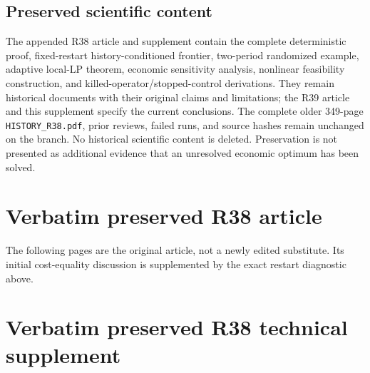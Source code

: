 \subsection{Preserved scientific content}
The appended R38 article and supplement contain the complete deterministic proof, fixed-restart history-conditioned frontier, two-period randomized example, adaptive local-LP theorem, economic sensitivity analysis, nonlinear feasibility construction, and killed-operator/stopped-control derivations. They remain historical documents with their original claims and limitations; the R39 article and this supplement specify the current conclusions. The complete older 349-page \texttt{HISTORY\_R38.pdf}, prior reviews, failed runs, and source hashes remain unchanged on the branch. No historical scientific content is deleted. Preservation is not presented as additional evidence that an unresolved economic optimum has been solved.

\clearpage
\section{Verbatim preserved R38 article}
The following pages are the original article, not a newly edited substitute. Its initial cost-equality discussion is supplemented by the exact restart diagnostic above.

\clearpage
\section{Verbatim preserved R38 technical supplement}


